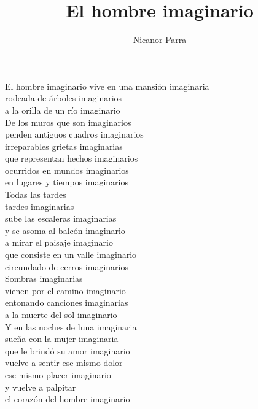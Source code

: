 \documentclass[12pt]{article}
\title{El hombre imaginario}
\author{Nicanor Parra}
\date{}
\begin{document}
\maketitle

\begin{center}
\begin{minipage}{0.8\textwidth}

El hombre imaginario vive en una mansión imaginaria\\
rodeada de árboles imaginarios\\
a la orilla de un río imaginario\\

De los muros que son imaginarios\\
penden antiguos cuadros imaginarios\\
irreparables grietas imaginarias\\
que representan hechos imaginarios\\
ocurridos en mundos imaginarios\\
en lugares y tiempos imaginarios\\

Todas las tardes\\
tardes imaginarias\\
sube las escaleras imaginarias\\
y se asoma al balcón imaginario\\
a mirar el paisaje imaginario\\
que consiste en un valle imaginario\\
circundado de cerros imaginarios\\

Sombras imaginarias\\
vienen por el camino imaginario\\
entonando canciones imaginarias\\
a la muerte del sol imaginario\\

Y en las noches de luna imaginaria\\
sueña con la mujer imaginaria\\
que le brindó su amor imaginario\\
vuelve a sentir ese mismo dolor\\
ese mismo placer imaginario\\
y vuelve a palpitar\\
el corazón del hombre imaginario

\end{minipage}
\end{center}
\end{document}
